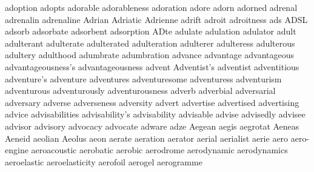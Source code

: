 adoption adopts adorable adorableness adoration adore adorn adorned adrenal adrenalin adrenaline Adrian Adriatic Adrienne adrift adroit adroitness ads ADSL adsorb adsorbate adsorbent adsorption ADte adulate adulation adulator adult adulterant adulterate adulterated adulteration adulterer adulteress adulterous adultery adulthood adumbrate adumbration advance advantage advantageous advantageousness's advantageousness advent Adventist's adventist adventitious adventure's adventure adventures adventuresome adventuress adventurism adventurous adventurously adventurousness adverb adverbial adversarial adversary adverse adverseness adversity advert advertise advertised advertising advice advisabilities advisability's advisability advisable advise advisedly advisee advisor advisory advocacy advocate adware adze Aegean aegis aegrotat Aeneas Aeneid aeolian Aeolus aeon aerate aeration aerator aerial aerialist aerie aero aero-engine aeroacoustic aerobatic aerobic aerodrome aerodynamic aerodynamics aeroelastic aeroelasticity aerofoil aerogel aerogramme 